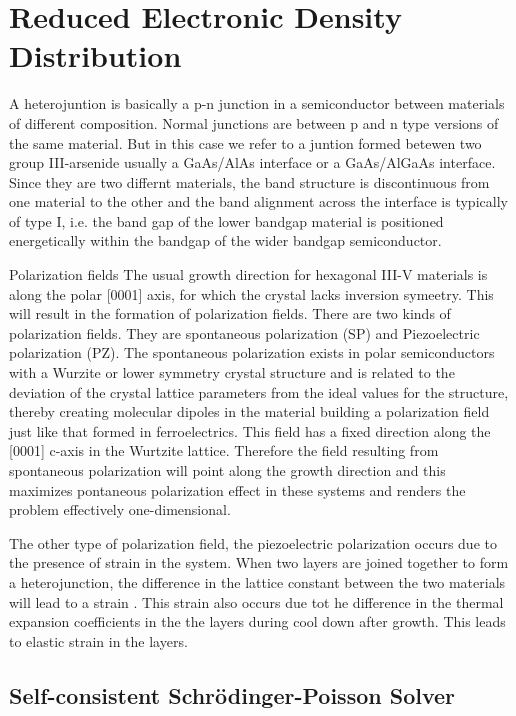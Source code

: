\chapter[Electron Distribution]{Reduced Electronic Density Distribution} \label{ED}

A heterojuntion is basically a p-n junction in a semiconductor between
materials of different composition. Normal junctions are between p and n type
versions of the same material. But in this case we refer to a juntion formed
betewen two group III-arsenide usually a GaAs/AlAs interface or a GaAs/AlGaAs
interface. Since they are two differnt materials, the band structure is
discontinuous from one material to the other and the band alignment across the
interface is typically of type I, i.e. the band gap of the lower bandgap
material is positioned energetically within the bandgap of the wider bandgap
semiconductor.

Polarization fields 
The usual growth direction for hexagonal III-V materials is
along the polar [0001] axis, for which the crystal lacks inversion symeetry.
This will result in the formation of polarization fields. There are two kinds
of polarization fields. They are spontaneous polarization (SP) and
Piezoelectric polarization (PZ).  The spontaneous polarization exists in polar
semiconductors with a Wurzite or lower symmetry crystal structure and is
related to the deviation of the crystal lattice parameters from the ideal
values for the structure, thereby creating molecular dipoles in the material
building a polarization field just like that formed in ferroelectrics. This
field has a fixed direction along the [0001] c-axis in the Wurtzite lattice.
Therefore the field resulting from spontaneous polarization will point along
the growth direction and this maximizes pontaneous polarization effect in these
systems and renders the problem effectively one-dimensional.

The other type of polarization field, the piezoelectric polarization occurs due
to the presence of strain in the system. When two layers are joined together to
form a heterojunction, the difference in the lattice constant between the two
materials will lead to a strain . This strain also occurs due tot he difference
in the thermal expansion coefficients in the the layers during cool down after
growth. This leads to elastic strain in the layers. 

\section{Self-consistent Schr{\"o}dinger-Poisson Solver} \label{sec:model}

